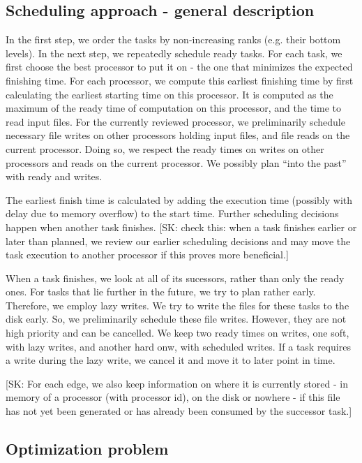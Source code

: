 \documentclass[conference]{IEEEtran}
\newcommand{\skug}[1]{{\color{blue}[SK: #1]}}
\begin{document}
\subsection{Scheduling approach - general description}

In the first step, we order the tasks by non-increasing ranks (e.g. their bottom levels).
In the next step, we repeatedly schedule ready tasks.
For each task, we first choose the best processor to put it on - the one that minimizes the expected finishing time.
For each processor, we compute this earliest finishing time by first calculating the earliest starting time on this processor.
It is computed as the maximum of the ready time of computation on this processor, and the time to read input files.
For the currently reviewed processor, we preliminarily schedule necessary file writes on other processors holding input files,
and file reads on the current processor.
Doing so, we respect the ready times on writes on other processors and reads on the current processor.
We possibly plan ``into the past'' with ready and writes.

The earliest finish time is calculated by adding the execution time (possibly with delay due to memory overflow) to the start time.
Further scheduling decisions happen when another task finishes.
\skug{check this: when a task finishes earlier or later than planned, we review our earlier scheduling decisions and may
move the task execution to another processor if this proves more beneficial.}

When a task finishes, we look at all of its sucessors, rather than only the ready ones.
For tasks that lie further in the future, we try to plan rather early.
Therefore, we employ lazy writes.
We try to write the files for these tasks to the disk early.
So, we preliminarily schedule these file writes. However, they are not high priority and can be cancelled.
We keep two ready times on writes, one soft, with lazy writes, and another hard onw, with scheduled writes.
If a task requires a write during the lazy write, we cancel it and move it to later point in time.

\skug{For each edge, we also keep information on where it is currently stored - in memory of a processor (with processor id),
        on the disk or nowhere - if this file has not yet been generated or has already been consumed by the successor task.}

\subsection{Optimization problem}
\label{sec.mod.pb}
\end{document}
